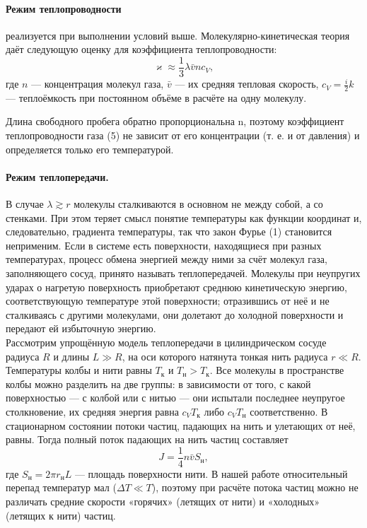 \documentclass[12pt,a4paper]{article}
\begin{document}
	
	
	\paragraph{Режим теплопроводности} реализуется при выполнении условий выше. Молекулярно-кинетическая теория даёт следующую оценку для коэффициента теплопроводности:
	\begin{equation}
	\varkappa \approx \frac{1}{3}\lambda\bar{v}nc_V,
	\end{equation}
	где $n$ --- концентрация молекул газа, $\bar{v}$ --- их средняя тепловая скорость, $c_V = \frac{i}{2}k$ --- теплоёмкость при постоянном объёме в расчёте на одну молекулу.
	
	Длина свободного пробега обратно пропорциональна n, поэтому коэффициент теплопроводности газа (5) не зависит от его концентрации (т. е. и от давления) и определяется только его температурой.
	
	
	
	\paragraph{Режим теплопередачи.} В случае $\lambda \gtrsim r$ молекулы сталкиваются в основном не между собой, а со стенками. При этом теряет смысл понятие температуры как функции координат и, следовательно, градиента температуры, так что закон Фурье (1) становится неприменим. Если в системе есть поверхности, находящиеся при разных температурах, процесс обмена энергией между ними за счёт молекул газа, заполняющего сосуд, принято называть теплопередачей. Молекулы при неупругих ударах о нагретую поверхность приобретают среднюю кинетическую энергию, соответствующую температуре этой поверхности; отразившись от неё и не сталкиваясь с другими молекулами, они долетают до холодной поверхности и передают ей избыточную энергию.\\
	
	Рассмотрим упрощённую модель теплопередачи в цилиндрическом сосуде радиуса $R$ и длины $L\gg R$, на оси которого натянута тонкая нить радиуса $r\ll R$. Температуры колбы и нити равны $T_\text{к}$ и $T_\text{н} > T_\text{к}$.
	Все молекулы в пространстве колбы можно разделить на две группы: в зависимости от того, с какой поверхностью --- с колбой или с нитью --- они испытали последнее неупругое столкновение, их средняя энергия равна $c_V T_\text{к}$ либо $c_V T_\text{н}$ соответственно. В стационарном состоянии потоки частиц, падающих на нить и улетающих от неё, равны. Тогда полный поток падающих на нить частиц составляет
	$$J = \frac{1}{4}n\bar{v}S_\text{н},$$
	где $S_\text{н} = 2\pi r_\text{н} L$ --- площадь поверхности нити. В нашей работе относительный перепад температур мал ($\Delta T \ll T$), поэтому при расчёте потока частиц можно не различать средние скорости «горячих» (летящих от нити) и «холодных» (летящих к нити) частиц.\\
	
\end{document}

